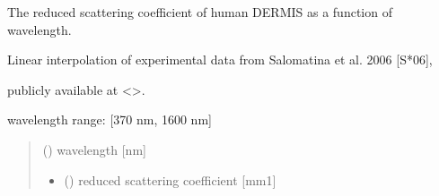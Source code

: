 \documentclass[letterpaper,10pt,english]{sphinxmanual}
\begin{document}

\begin{fulllineitems}
\label{\detokenize{04_scattering_coefficient:skinoptics.scattering_coefficient.rmus_DE_Salomatina}}
\pysigstartsignatures
{}
\pysigstopsignatures
\begin{DUlineblock}{0em}
\item[] The reduced scattering coefficient of human DERMIS as a function of wavelength.
\item[] Linear interpolation of experimental data from Salomatina et al. 2006 {[}S*06{]},
\item[] publicly available at \textless{}\textgreater{}.
\end{DUlineblock}

\begin{DUlineblock}{0em}
\item[] wavelength range: {[}370 nm, 1600 nm{]}
\end{DUlineblock}
\begin{quote}\begin{description}
\sphinxAtStartPar
{} () \textendash{} wavelength {[}nm{]}

\sphinxAtStartPar
\begin{itemize}
\item {} 
\sphinxAtStartPar
{} () \textendash{} reduced scattering coefficient {[}mm\sphinxhyphen{}1{]}

\end{itemize}


\end{description}\end{quote}

\end{fulllineitems}

\end{document}
